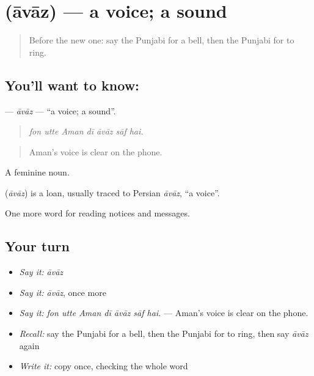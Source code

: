\section[\texorpdfstring{\pa{ਆਵਾਜ਼} (āvāz)}{ਆਵਾਜ਼ (āvāz)}]{ (āvāz) — a voice; a sound}

\label{lesson:PA-C259-avaz}



\begin{quote}
Before the new one: say the Punjabi for a bell, then the Punjabi for to ring.
\end{quote}

\subsection*{You'll want to know: }
\textbf{} — \emph{āvāz} — \textquotedblleft{}a voice; a sound\textquotedblright{}.

\begin{quote}
      
\end{quote}

\begin{quote}
\emph{fon utte Aman dī āvāz sāf hai.}
\end{quote}

\begin{quote}
Aman's voice is clear on the phone.
\end{quote}

A feminine noun.

\begin{cousinweb}
\textbf{} (\emph{āvāz}) is a loan, usually traced to Persian \emph{āvāz}, \textquotedblleft{}a voice\textquotedblright{}.
\end{cousinweb}

\begin{grammarlens}[title={What you've built}]
One more word for reading notices and messages.
\end{grammarlens}

\subsection*{Your turn}
\begin{itemize}
\raggedright
  \item \emph{Say it:} \emph{āvāz}
  \item \emph{Say it:} \emph{āvāz}, once more
  \item \emph{Say it:} \emph{fon utte Aman dī āvāz sāf hai.} — Aman's voice is clear on the phone.
  \item \emph{Recall:} say the Punjabi for a bell, then the Punjabi for to ring, then say \emph{āvāz} again
  \item \emph{Write it:} copy \textbf{} once, checking the whole word
\end{itemize}

